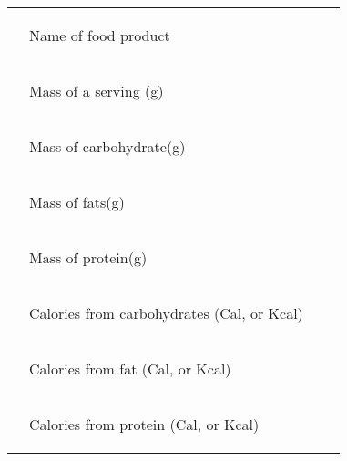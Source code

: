 \documentclass[main.tex]{subfiles}
\begin{document}
\begin{fullwidth}
\begin{center}\begin{tabular}{ p{2.0cm}p{7.5cm}p{3cm}p{5cm}  }
\hline
 &\begin{center}Name of food product \end{center}&&\begin{center}\rule{3.0cm}{0.4pt}\end{center}\\
    & \begin{center}Mass of a serving (g)\end{center}&&\begin{center}\rule{3.0cm}{0.4pt}\end{center}\\
      & \begin{center}Mass of carbohydrate(g)\end{center}&&\begin{center}\rule{3.0cm}{0.4pt}\end{center}\\
            & \begin{center}Mass of fats(g)\end{center}&&\begin{center}\rule{3.0cm}{0.4pt}\end{center}\\
                  & \begin{center}Mass of protein(g)\end{center}&&\begin{center}\rule{3.0cm}{0.4pt}\end{center}\\
            & \begin{center}Calories from carbohydrates (Cal, or Kcal)\end{center}&&\begin{center}\rule{3.0cm}{0.4pt}\end{center}\\
                        & \begin{center}Calories from fat (Cal, or Kcal)\end{center}&&\begin{center}\rule{3.0cm}{0.4pt}\end{center}\\
            & \begin{center}Calories from protein (Cal, or Kcal)\end{center}&&\begin{center}\rule{3.0cm}{0.4pt}\end{center}\\


\end{tabular}
\end{center}
\end{fullwidth}
\end{document}
